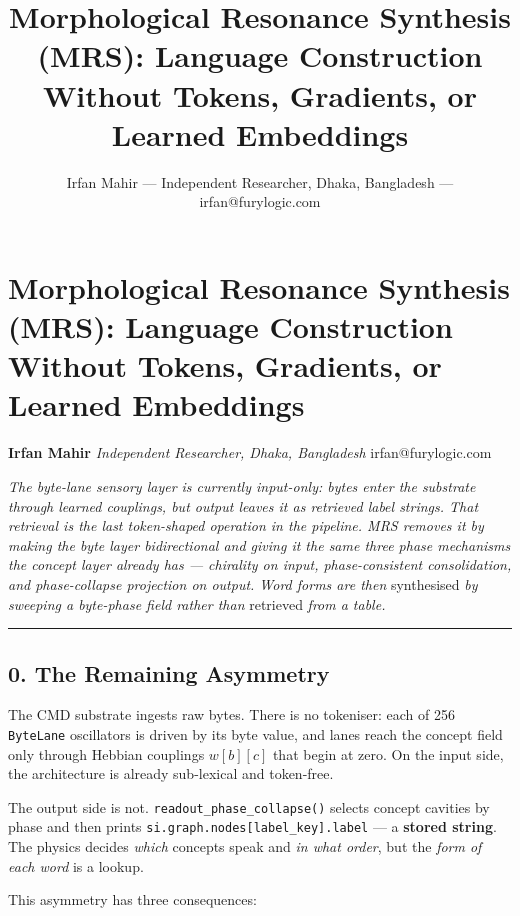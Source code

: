\documentclass[
  11pt,
  a4paper,
]{article}
\title{Morphological Resonance Synthesis (MRS): Language Construction
Without Tokens, Gradients, or Learned Embeddings}
\author{Irfan Mahir --- Independent Researcher, Dhaka, Bangladesh ---
irfan@furylogic.com}
\date{}
\begin{document}
\maketitle

{
\hypersetup{linkcolor=}
\setcounter{tocdepth}{3}
\tableofcontents
}
\section{Morphological Resonance Synthesis (MRS): Language Construction
Without Tokens, Gradients, or Learned
Embeddings}\label{morphological-resonance-synthesis-mrs-language-construction-without-tokens-gradients-or-learned-embeddings}

\textbf{Irfan Mahir} \emph{Independent Researcher, Dhaka, Bangladesh}
irfan@furylogic.com

\emph{The byte-lane sensory layer is currently input-only: bytes enter
the substrate through learned couplings, but output leaves it as
retrieved label strings. That retrieval is the last token-shaped
operation in the pipeline. MRS removes it by making the byte layer
bidirectional and giving it the same three phase mechanisms the concept
layer already has --- chirality on input, phase-consistent
consolidation, and phase-collapse projection on output. Word forms are
then} synthesised \emph{by sweeping a byte-phase field rather than}
retrieved \emph{from a table.}

\begin{center}\rule{0.5\linewidth}{0.5pt}\end{center}

\subsection{0. The Remaining Asymmetry}\label{the-remaining-asymmetry}

The CMD substrate ingests raw bytes. There is no tokeniser: each of 256
\texttt{ByteLane} oscillators is driven by its byte value, and lanes
reach the concept field only through Hebbian couplings \(w[b][c]\) that
begin at zero. On the input side, the architecture is already
sub-lexical and token-free.

The output side is not. \texttt{readout\_phase\_collapse()} selects
concept cavities by phase and then prints
\texttt{si.graph.nodes{[}label\_key{]}.label} --- a \textbf{stored
string}. The physics decides \emph{which} concepts speak and \emph{in
what order}, but the \emph{form of each word} is a lookup.

This asymmetry has three consequences:
\end{document}
